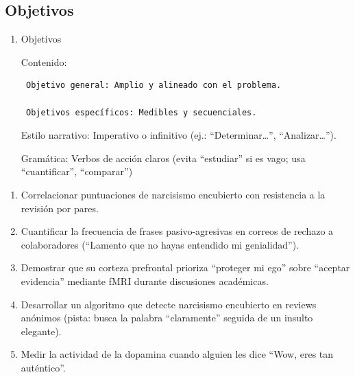\documentclass[
  10pt]{article}
\begin{document}
\subsection{Objetivos}\label{objetivos}

\begin{tcolorbox}[enhanced jigsaw, colframe=quarto-callout-tip-color-frame, toprule=.15mm, opacitybacktitle=0.6, arc=.35mm, coltitle=black, title=\textcolor{quarto-callout-tip-color}{\faLightbulb}\hspace{0.5em}{Tip}, breakable, rightrule=.15mm, bottomtitle=1mm, titlerule=0mm, leftrule=.75mm, opacityback=0, colbacktitle=quarto-callout-tip-color!10!white, colback=white, left=2mm, bottomrule=.15mm, toptitle=1mm]

\begin{enumerate}
\def\labelenumi{\arabic{enumi}.}
\setcounter{enumi}{4}
\item
  Objetivos

  Contenido:

\begin{verbatim}
 Objetivo general: Amplio y alineado con el problema.

 Objetivos específicos: Medibles y secuenciales.
\end{verbatim}

  Estilo narrativo: Imperativo o infinitivo (ej.:
  ``Determinar\ldots{}'', ``Analizar\ldots{}'').

  Gramática: Verbos de acción claros (evita ``estudiar'' si es vago; usa
  ``cuantificar'', ``comparar'')
\end{enumerate}

\end{tcolorbox}

\begin{enumerate}
\def\labelenumi{\roman{enumi}.}
\item
  Correlacionar puntuaciones de narcisismo encubierto con resistencia a
  la revisión por pares.
\item
  Cuantificar la frecuencia de frases pasivo-agresivas en correos de
  rechazo a colaboradores (``Lamento que no hayas entendido mi
  genialidad'').
\item
  Demostrar que su corteza prefrontal prioriza ``proteger mi ego'' sobre
  ``aceptar evidencia'' mediante fMRI durante discusiones académicas.
\item
  Desarrollar un algoritmo que detecte narcisismo encubierto en reviews
  anónimos (pista: busca la palabra ``claramente'' seguida de un insulto
  elegante).
\item
  Medir la actividad de la dopamina cuando alguien les dice ``Wow, eres
  tan auténtico''.
\end{enumerate}
\end{document}
